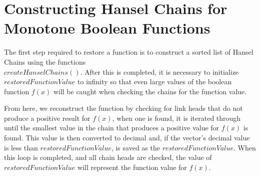\documentclass{article}
\renewcommand{\_}{\ifincsname_\else\legacyunderscore\fi}
\begin{document}
\section*{Constructing Hansel Chains for Monotone Boolean Functions}

The first step required to restore a function is to construct a sorted list of Hansel Chains using the functions \\$createHanselChains()$. After this is completed, it is necessary to initialize $restoredFunctionValue$ to infinity so that even large values of the boolean function $f(x)$ will be caught when checking the chains for the function value.

From here, we reconstruct the function by checking for link heads that do not produce a positive result for $f(x)$, when one is found, it is iterated through until the smallest value in the chain that produces a positive value for $f(x)$ is found. This value is then converted to decimal and, if the vector's decimal value is less than $restoredFunctionValue$, is saved as the $restoredFunctionValue$. When this loop is completed, and all chain heads are checked, the value of $restoredFunctionValue$ will represent the function value for $f(x)$.
\end{document}

